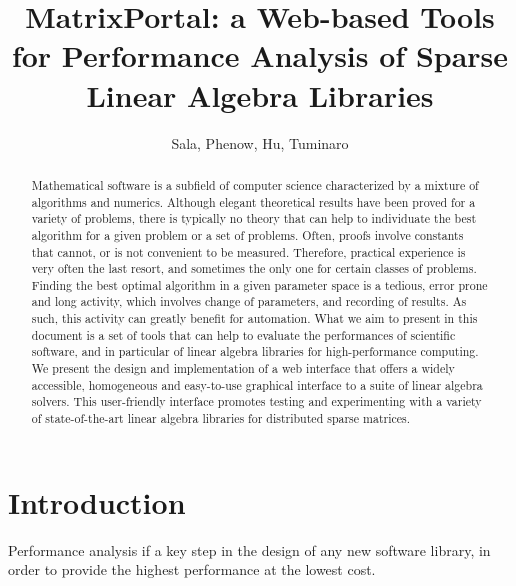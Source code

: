 \documentclass[11pt,relax]{SANDreport}
\author{Sala, Phenow, Hu, Tuminaro}
\title{MatrixPortal: a Web-based Tools for Performance Analysis of Sparse Linear
Algebra Libraries}
\begin{document}
\maketitle

\begin{abstract}
Mathematical software is a subfield of computer science
characterized by a mixture of algorithms and numerics. Although elegant
theoretical results have been proved for a variety of problems, there is
typically no theory that can help to individuate the best algorithm for a
given problem or a set of problems. Often, proofs involve constants that
cannot, or is not convenient to be measured. Therefore, practical experience
is very often the last resort, and sometimes the only one for certain classes
of problems. Finding the best optimal algorithm in a given parameter space is
a tedious, error prone and long activity, which involves change of parameters,
and recording of results. As such, this activity can greatly benefit for
automation.  What we aim to present in this document is a set of tools that
can help to  evaluate the performances of scientific software, and in
particular of linear algebra libraries for high-performance computing. We
present the design and implementation of a  web interface that offers
a widely accessible, homogeneous
and easy-to-use graphical interface to a suite of linear algebra solvers.
This user-friendly interface promotes testing and
experimenting with a variety of state-of-the-art linear algebra libraries for
distributed sparse matrices.
\end{abstract}

\clearpage

\SANDmain

\tableofcontents

\clearpage
\newpage


\section{Introduction}

Performance analysis if a key step in the design of any new
software library, in order to provide the highest performance at the lowest
cost. 
\end{document}
